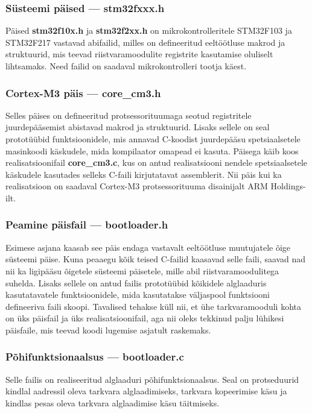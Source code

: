 \documentclass[12pt,a4paper]{article}
\begin{document}
\subsubsection{Süsteemi päised --- \textbf{stm32fxxx.h}}
\label{sec:comp:sysheader}
Päised \textbf{stm32f10x.h} ja \textbf{stm32f2xx.h} on mikrokontrolleritele
STM32F103 ja STM32F217 vastavad abifailid, milles on defineeritud eeltöötluse
makrod ja struktuurid, mis teevad riistvaramoodulite registrite kasutamise
oluliselt lihtsamaks. Need failid on saadaval mikrokontrolleri tootja käest.

\subsubsection{Cortex-M3 päis --- \textbf{core\_cm3.h}}
\label{sec:comp:core}
Selles päises on defineeritud protsessorituumaga seotud registritele
juurde\-pää\-se\-mist abistavad makrod ja struktuurid. Lisaks sellele on seal
prototüübid funktsioonidele, mis annavad C-koodist juurdepääsu spetsiaalsetele
masinkoodi käskudele, mida kompilaator omapead ei kasuta. Päisega käib koos
realisatsioonifail \textbf{core\_cm3.c}, kus on antud realisatsiooni
nendele spetsiaalsetele käskudele kasutades selleks C-faili kirjutatavat
assemblerit. Nii päis kui ka realisatsioon on saadaval Cortex-M3
protsessorituuma disainijalt ARM Holdings-ilt.

\subsubsection{Peamine päisfail --- \textbf{bootloader.h}}
Esimese asjana kaasab see päis endaga vastavalt eeltöötluse muutujatele õige
süsteemi päise. Kuna peaaegu kõik teised C-failid kaasavad selle faili, saavad
nad nii ka ligipääsu õigetele süsteemi päisetele, mille abil
riistvaramoodulitega suhelda. Lisaks sellele on antud failis prototüübid
kõikidele alglaaduris kasutatavatele funktsioonidele, mida kasutatakse
väljaspool funktsiooni defineeriva faili skoopi. Tavalised tehakse küll nii, et
ühe tarkvaramooduli kohta on üks päisfail ja üks realisatsioonifail, aga nii
oleks tekkinud palju lühikesi päisfaile, mis teevad koodi lugemise asjatult
raskemaks.

\subsubsection{Põhifunktsionaalsus --- \textbf{bootloader.c}}
Selle failis on realiseeritud alglaaduri põhifunktsionaalsus. Seal on
protseduurid kindlal aadressil oleva tarkvara alglaadimiseks, tarkvara
kopeerimise käsu ja kindlas pesas oleva tarkvara alglaadimise käsu täitmiseks.
\end{document}
